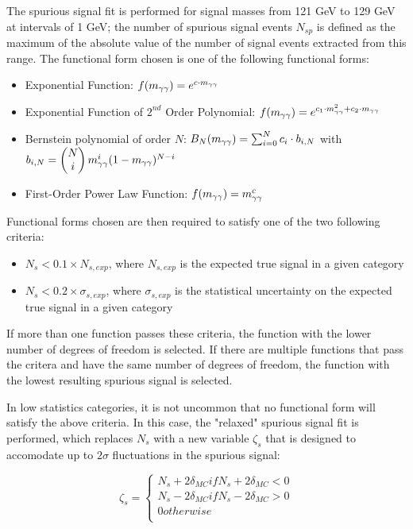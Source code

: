The spurious signal fit is performed for signal masses from 121 GeV to 129 GeV at intervals of 1 GeV; the number of spurious signal events $N_{sp}$ is defined as the maximum of the absolute value of the number of signal events extracted from this range. The functional form chosen is one of the following functional forms:

\begin{itemize}
\item Exponential Function: $f(m_{\gamma\gamma}) = e^{c\cdot m_{\gamma\gamma}}$
\item Exponential Function of $2^{nd}$ Order Polynomial: $f(m_{\gamma\gamma}) = e^{c_1\cdot m^2_{\gamma\gamma}+c_2\cdot m_{\gamma\gamma}}$
\item Bernstein polynomial of order $N$: $B_{N}(m_{\gamma\gamma}) = \sum_{i=0}^N c_i\cdot b_{i,N}$ with $b_{i,N} = \begin{pmatrix}N\\i\end{pmatrix}m_{\gamma\gamma}^i (1-m_{\gamma\gamma})^{N-i}$
\item First-Order Power Law Function: $f(m_{\gamma\gamma}) = m_{\gamma\gamma}^c$
\end{itemize}

Functional forms chosen are then required to satisfy one of the two following criteria:

\begin{itemize}
\item $N_{s} < 0.1 \times N_{s,exp}$, where $N_{s,exp}$ is the expected true signal in a given category
\item $N_{s} < 0.2 \times \sigma_{s,exp}$, where $\sigma_{s,exp}$ is the statistical uncertainty on the expected true signal in a given category
\end{itemize}

If more than one function passes these criteria, the function with the lower number of degrees of freedom is selected. If there are multiple functions that pass the critera and have the same number of degrees of freedom, the function with the lowest resulting spurious signal is selected.

In low statistics categories, it is not uncommon that no functional form will satisfy the above criteria. In this case, the "relaxed" spurious signal fit is performed, which replaces $N_{s}$ with a new variable $\zeta_{s}$ that is designed to accomodate up to $2\sigma$ fluctuations in the spurious signal:

\[\zeta_{s} = \begin{cases} 
      N_{s} + 2 \delta_{MC} if  N_{s} + 2 \delta_{MC} < 0\\
      N_{s} - 2 \delta_{MC} if  N_{s} - 2 \delta_{MC} > 0\\
      0 otherwise \\
   \end{cases}
\]

